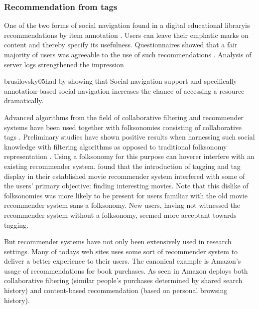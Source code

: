 \subsubsection{Recommendation from tags}

One of the two forms of social navigation found in
\dash{}a digital educational
library\dash{}is recommendations by item
annotation \citep[]{brusilovsky05}. Users can leave their emphatic marks
on content and thereby specify its usefulness. Questionnaires showed that a
fair majority of users was agreeable to the use of such recommendations
\citeyearpar[]{brusilovsky05}. Analysis  of server logs strengthened
the impression
\begin{fullquote}[\p{38}]{brusilovsky05}{had by showing that}
  Social navigation support and specifically
  annotation-based social navigation increases the chance of
  accessing a resource dramatically.
\end{fullquote}

Advanced algorithms from the field of collaborative filtering
and recommender systems have been used together with folksonomies
consisting of collaborative tags
\citep[]{wu06}. Preliminary studies have shown positive
results when harnessing such social knowledge with filtering algorithms
as opposed to traditional folksonomy representation
\citep[]{wu06}.
Using a folksonomy for this purpose can hoverer interfere with an
existing recommender system. \citet[]{sen06} found that the
introduction of tagging and tag display in their established
movie recommender system interfered with some of the users' primary
objective: finding interesting movies. Note that this dislike of
folksonomies was more likely to be present for users familiar with the old
movie recommender system sans a folksonomy. New users, having not
witnessed the recommender system without a folksonomy, seemed more
acceptant towards tagging.

But recommender systems have not only been extensively used in research
settings. Many of todays web sites uses some sort of recommender system to
deliver a better experience to their users. The canonical example is Amazon's%
usage of recommendations for book purchases. As seen in
Amazon deploys both collaborative filtering (similar people's purchases
determined by shared search history) and content-based recommendation (based
on personal browsing history).

